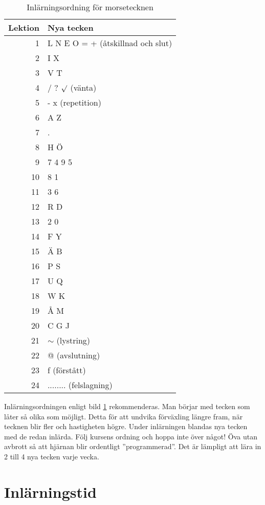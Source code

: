 \begin{table}[h]
  \centering
   \begin{tabular}{|r|l|}
  	\hline
  	\textbf{Lektion} & \textbf{Nya tecken} \\ \hline
  	1 & L N E O = + (åtskillnad och slut) \\
  	2 & I X \\
  	3 & V T \\
  	4 & / ? $\surd$ (vänta) \\
  	5 & - x (repetition) \\
  	6 & A Z \\
  	7 & . \\
  	8 & H Ö \\
  	9 & 7 4 9 5 \\
  	10 & 8 1 \\
  	11 & 3 6 \\
  	12 & R D \\
  	13 & 2 0 \\
  	14 & F Y \\
  	15 & Ä B \\
  	16 & P S \\
  	17 & U Q \\
  	18 & W K \\
  	19 & Å M \\
  	20 & C G J \\
  	21 & $\sim$ (lystring) \\
  	22 & @ (avslutning) \\
  	23 & f (förstått) \\
  	24 & ........ (felslagning) \\
  	\hline
  \end{tabular}
  \caption{Inlärningsordning för morsetecknen}
  \label{fig:morse_ordning}
\end{table}

Inlärningsordningen enligt bild \ref{fig:morse_ordning} rekommenderas.
Man börjar med tecken som låter så olika som möjligt.
Detta för att undvika förväxling längre fram, när tecknen blir fler och
hastigheten högre.
Under inlärningen blandas nya tecken med de redan inlärda.
Följ kursens ordning och hoppa inte över något!
Öva utan avbrott så att hjärnan blir ordentligt ''programmerad''.
Det är lämpligt att lära in 2 till 4 nya tecken varje vecka.

\section{Inlärningstid}

